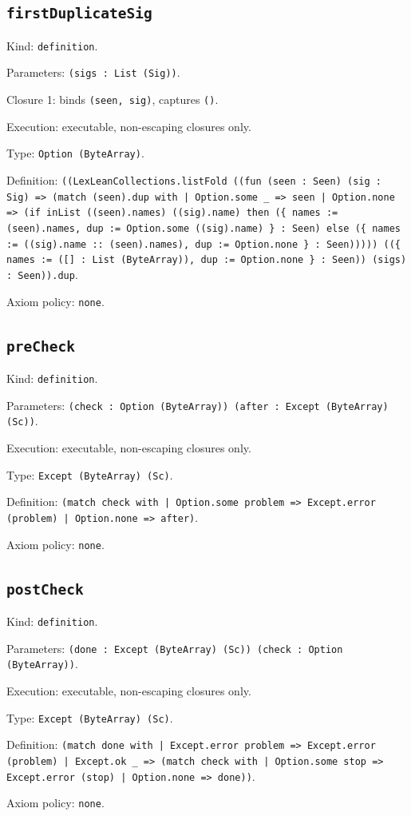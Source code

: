 \documentclass[11pt]{article}
\begin{document}
\subsection*{\texttt{firstDuplicateSig}}
\noindent Kind: \texttt{definition}.\par
\noindent Parameters: \texttt{(sigs : List (Sig))}.\par
\noindent Closure 1: binds \texttt{(seen, sig)}, captures \texttt{()}.\par
\noindent Execution: executable, non-escaping closures only.\par
\noindent Type: \texttt{Option (ByteArray)}.\par
\noindent Definition: \texttt{((LexLeanCollections.listFold ((fun (seen : Seen) (sig : Sig) => (match (seen).dup with | Option.some \_ => seen | Option.none => (if inList ((seen).names) ((sig).name) then (\{ names := (seen).names, dup := Option.some ((sig).name) \} : Seen) else (\{ names := ((sig).name :: (seen).names), dup := Option.none \} : Seen))))) ((\{ names := ([] : List (ByteArray)), dup := Option.none \} : Seen)) (sigs) : Seen)).dup}.\par
\noindent Axiom policy: \texttt{none}.\par
\subsection*{\texttt{preCheck}}
\noindent Kind: \texttt{definition}.\par
\noindent Parameters: \texttt{(check : Option (ByteArray)) (after : Except (ByteArray) (Sc))}.\par
\noindent Execution: executable, non-escaping closures only.\par
\noindent Type: \texttt{Except (ByteArray) (Sc)}.\par
\noindent Definition: \texttt{(match check with | Option.some problem => Except.error (problem) | Option.none => after)}.\par
\noindent Axiom policy: \texttt{none}.\par
\subsection*{\texttt{postCheck}}
\noindent Kind: \texttt{definition}.\par
\noindent Parameters: \texttt{(done : Except (ByteArray) (Sc)) (check : Option (ByteArray))}.\par
\noindent Execution: executable, non-escaping closures only.\par
\noindent Type: \texttt{Except (ByteArray) (Sc)}.\par
\noindent Definition: \texttt{(match done with | Except.error problem => Except.error (problem) | Except.ok \_ => (match check with | Option.some stop => Except.error (stop) | Option.none => done))}.\par
\noindent Axiom policy: \texttt{none}.\par
\end{document}
